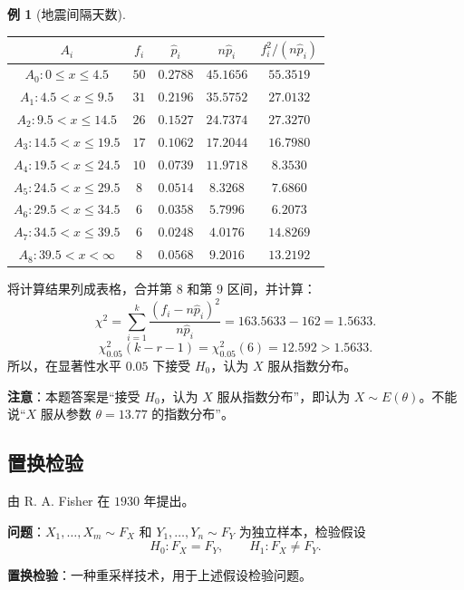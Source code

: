 \documentclass[11pt,a4paper]{report}
\theoremstyle{definition}
\newtheorem{example}{例}[chapter]
\begin{document}
\begin{example}[地震间隔天数]
\begin{table}[htbp]
\centering
\begin{tabular}{@{}ccccc@{}}
\toprule
$A_{i}$ & $f_{i}$ & $\widehat{p}_{i}$ & $n\widehat{p}_{i}$ & $f_{i}^{2}/(n\widehat{p}_{i})$ \\
\midrule
$A_{0}\colon 0\leq x\leq 4.5$ & $50$ & $0.2788$ & $45.1656$ & $55.3519$ \\
$A_{1}\colon 4.5<x\leq 9.5$ & $31$ & $0.2196$ & $35.5752$ & $27.0132$ \\
$A_{2}\colon 9.5<x\leq 14.5$ & $26$ & $0.1527$ & $24.7374$ & $27.3270$ \\
$A_{3}\colon 14.5<x\leq 19.5$ & $17$ & $0.1062$ & $17.2044$ & $16.7980$ \\
$A_{4}\colon 19.5<x\leq 24.5$ & $10$ & $0.0739$ & $11.9718$ & $8.3530$ \\
$A_{5}\colon 24.5<x\leq 29.5$ & $8$ & $0.0514$ & $8.3268$ & $7.6860$ \\
$A_{6}\colon 29.5<x\leq 34.5$ & $6$ & $0.0358$ & $5.7996$ & $6.2073$ \\
$A_{7}\colon 34.5<x\leq 39.5$ & $6$ & $0.0248$ & $4.0176$ & $14.8269$ \\
$A_{8}\colon 39.5<x<\infty$ & $8$ & $0.0568$ & $9.2016$ & $13.2192$ \\
\bottomrule
\end{tabular}
\end{table}

将计算结果列成表格，合并第 $8$ 和第 $9$ 区间，并计算：
\[
\chi^{2}=\sum_{i=1}^{k}\frac{(f_{i}-n\widehat{p}_{i})^{2}}{n\widehat{p}_{i}}=163.5633-162=1.5633.
\]
\[
\chi_{0.05}^{2}(k-r-1)=\chi_{0.05}^{2}(6)=12.592>1.5633.
\]
所以，在显著性水平 $0.05$ 下接受 $H_{0}$，认为 $X$ 服从指数分布。

\textbf{注意}：本题答案是“接受 $H_{0}$，认为 $X$ 服从指数分布”，即认为 $X\sim E(\theta)$。不能说“$X$ 服从参数 $\theta=13.77$ 的指数分布”。
\end{example}

\subsection{置换检验}

由 R. A. Fisher 在 $1930$ 年提出。

\textbf{问题}：$X_{1},\ldots,X_{m}\sim F_{X}$ 和 $Y_{1},\ldots,Y_{n}\sim F_{Y}$ 为独立样本，检验假设
\[
H_{0}\colon F_{X}=F_{Y},\qquad H_{1}\colon F_{X}\neq F_{Y}.
\]

\textbf{置换检验}：一种重采样技术，用于上述假设检验问题。
\end{document}
